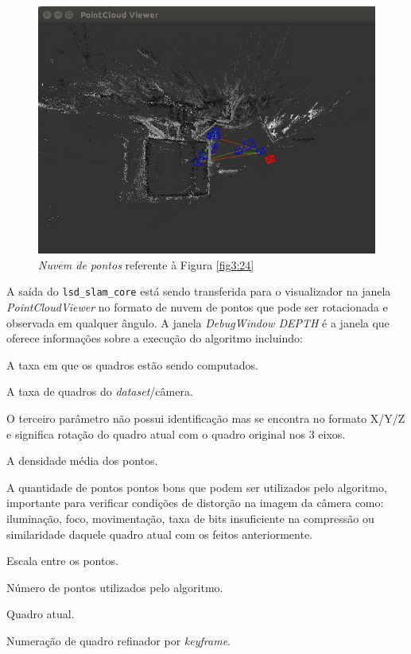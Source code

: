 \begin{figure}[H]
	\centering
		\includegraphics[width= \textwidth]{Imagens/figura3-25.jpg}
	\caption{\textit{Nuvem de pontos} referente à Figura \ref{fig3:24}}
	\label{fig3:25}
\end{figure}

A saída do \texttt{lsd\_slam\_core} está sendo transferida para o visualizador na janela \textit{PointCloudViewer} no formato de nuvem de pontos que pode ser rotacionada e observada em qualquer ângulo. A janela \textit{DebugWindow DEPTH} é a janela que oferece informações sobre a execução do algoritmo incluindo:

\begin{description}
	\item[Map upd :]{A taxa em que os quadros estão sendo computados.}
	\item[Trk :]{A taxa de quadros do \textit{dataset}/câmera.}
	\item[X/Y/Z :]{O terceiro parâmetro não possui identificação mas se encontra no formato X/Y/Z e significa rotação do quadro atual com o quadro original nos 3 eixos.}
	\item[Dens X\% :]{A densidade média dos pontos.}
	\item[Good X\% :]{ A quantidade de pontos pontos bons que podem ser utilizados pelo algoritmo, importante para verificar condições de distorção na imagem da câmera como: iluminação, foco, movimentação, taxa de bits insuficiente na compressão ou similaridade daquele quadro atual com os feitos anteriormente.}
	\item[Scale X\% :]{Escala entre os pontos.}
	\item{Número de pontos utilizados pelo algoritmo.}
	\item{Quadro atual.}
	\item{Numeração de quadro refinador por \textit{keyframe}.}
\end{description}

